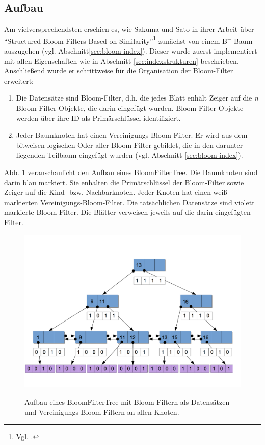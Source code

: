 \subsection{Aufbau}\label{sec:aufbau} 
Am vielversprechendsten erschien es, wie Sakuma und Sato in ihrer Arbeit über "`Structured Bloom Filters Based on Similarity"'\footnote{Vgl. \cite{Sakuma2011}.} zunächst von einem B$^+$-Baum auszugehen (vgl. Abschnitt\ref{sec:bloom-index}). Dieser wurde zuerst implementiert mit allen Eigenschaften wie in Abschnitt \ref{sec:indexstrukturen} beschrieben. Anschließend wurde er schrittweise für die Organisation der Bloom-Filter erweitert: 
\begin{enumerate}
	\item Die Datensätze sind Bloom-Filter, d.h. die jedes Blatt enhält Zeiger auf die \textit{n} Bloom-Filter-Objekte, die darin eingefügt wurden. Bloom-Filter-Objekte werden über ihre ID als Primärschlüssel identifiziert. 
	\item Jeder Baumknoten hat einen Vereinigungs-Bloom-Filter. Er wird aus dem bitweisen logischen Oder aller Bloom-Filter gebildet, die in den darunter liegenden Teilbaum eingefügt wurden (vgl. Abschnitt \ref{sec:bloom-index}).
\end{enumerate}
Abb. \ref{fig:pic6} veranschaulicht den Aufbau eines BloomFilterTree. Die Baumknoten sind darin blau markiert. Sie enhalten die Primärschlüssel der Bloom-Filter sowie Zeiger auf die Kind- bzw. Nachbarknoten. Jeder Knoten hat einen weiß markierten Vereinigungs-Bloom-Filter. Die tatsächlichen Datensätze sind violett markierte Bloom-Filter. Die Blätter verweisen jeweils auf die darin eingefügten Filter.
\begin{figure}[hpbt]
  \centering
  \includegraphics[width=1.0\textwidth]{pictures/bloom-filter-tree2.png}\\
  \caption[Aufbau eines BloomFilterTree]{Aufbau eines BloomFilterTree mit Bloom-Filtern als Datensätzen und Vereinigungs-Bloom-Filtern an allen Knoten.}\label{fig:pic6}
\end{figure}
